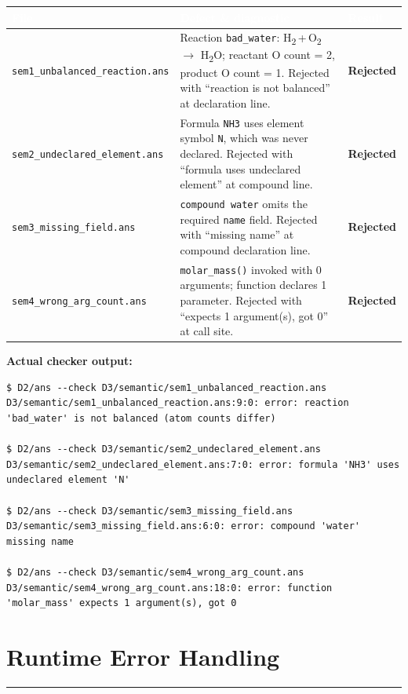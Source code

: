 \documentclass[11pt,a4paper]{article}
\newcommand{\code}[1]{\texttt{#1}}
\newcommand{\file}[1]{{\footnotesize\texttt{#1}}}
\newcommand{\statuserr}{\textcolor{ansdanger}{\textbf{Rejected}}}
\newcommand{\sectionrule}{\vspace{-3pt}\textcolor{ansborder}{\rule{\textwidth}{0.6pt}}\vspace{2pt}}
\begin{document}
\begin{table}[h]
\vspace{2pt}
\centering\small
{}
\begin{tabularx}{\textwidth}{@{} Y Y L{1.5cm} @{}}
\toprule
{}
\textcolor{white}{\textbf{File}} &
\textcolor{white}{\textbf{Defect \& diagnostic}} &
\textcolor{white}{\textbf{Result}} \\
\midrule
\file{sem1\_unbalanced\_reaction.ans} &
Reaction \code{bad\_water}: H\textsubscript{2}\,+\,O\textsubscript{2}
$\to$ H\textsubscript{2}O; reactant O count = 2, product O count = 1.
Rejected with ``reaction is not balanced'' at declaration line. &
\statuserr \\
\file{sem2\_undeclared\_element.ans} &
Formula \code{NH3} uses element symbol \code{N}, which was never declared.
Rejected with ``formula uses undeclared element'' at compound line. &
\statuserr \\
\file{sem3\_missing\_field.ans} &
\code{compound water} omits the required \code{name} field.
Rejected with ``missing name'' at compound declaration line. &
\statuserr \\
\file{sem4\_wrong\_arg\_count.ans} &
\code{molar\_mass()} invoked with 0 arguments; function declares 1 parameter.
Rejected with ``expects 1 argument(s), got 0'' at call site. &
\statuserr \\
\bottomrule
\end{tabularx}
\end{table}

\textbf{Actual checker output:}
\begin{lstlisting}[style=terminal]
$ D2/ans --check D3/semantic/sem1_unbalanced_reaction.ans
D3/semantic/sem1_unbalanced_reaction.ans:9:0: error: reaction 'bad_water' is not balanced (atom counts differ)

$ D2/ans --check D3/semantic/sem2_undeclared_element.ans
D3/semantic/sem2_undeclared_element.ans:7:0: error: formula 'NH3' uses undeclared element 'N'

$ D2/ans --check D3/semantic/sem3_missing_field.ans
D3/semantic/sem3_missing_field.ans:6:0: error: compound 'water' missing name

$ D2/ans --check D3/semantic/sem4_wrong_arg_count.ans
D3/semantic/sem4_wrong_arg_count.ans:18:0: error: function 'molar_mass' expects 1 argument(s), got 0
\end{lstlisting}

\section{Runtime Error Handling}
\sectionrule
\end{document}
